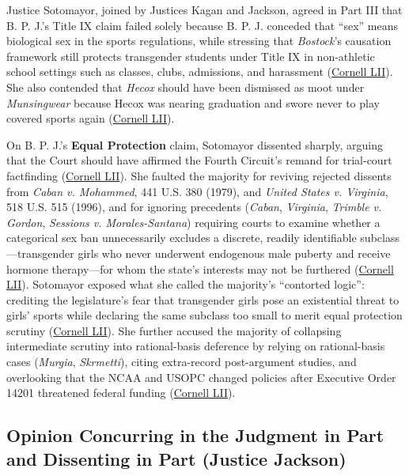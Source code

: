 \documentclass[12pt]{article}
\begin{document}
Justice Sotomayor, joined by Justices Kagan and Jackson, agreed in Part III that B. P. J.'s Title IX claim failed solely because B. P. J. conceded that ``sex'' means biological sex in the sports regulations, while stressing that \textit{Bostock}'s causation framework still protects transgender students under Title IX in non-athletic school settings such as classes, clubs, admissions, and harassment (\href{https://www.law.cornell.edu/supremecourt/text/24-43}{Cornell LII}). She also contended that \textit{Hecox} should have been dismissed as moot under \textit{Munsingwear} because Hecox was nearing graduation and swore never to play covered sports again (\href{https://www.law.cornell.edu/supremecourt/text/24-43}{Cornell LII}).

On B. P. J.'s \textbf{Equal Protection} claim, Sotomayor dissented sharply, arguing that the Court should have affirmed the Fourth Circuit's remand for trial-court factfinding (\href{https://www.law.cornell.edu/supremecourt/text/24-43}{Cornell LII}). She faulted the majority for reviving rejected dissents from \textit{Caban v. Mohammed}, 441 U.S. 380 (1979), and \textit{United States v. Virginia}, 518 U.S. 515 (1996), and for ignoring precedents (\textit{Caban}, \textit{Virginia}, \textit{Trimble v. Gordon}, \textit{Sessions v. Morales-Santana}) requiring courts to examine whether a categorical sex ban unnecessarily excludes a discrete, readily identifiable subclass---transgender girls who never underwent endogenous male puberty and receive hormone therapy---for whom the state's interests may not be furthered (\href{https://www.law.cornell.edu/supremecourt/text/24-43}{Cornell LII}). Sotomayor exposed what she called the majority's ``contorted logic'': crediting the legislature's fear that transgender girls pose an existential threat to girls' sports while declaring the same subclass too small to merit equal protection scrutiny (\href{https://www.law.cornell.edu/supremecourt/text/24-43}{Cornell LII}). She further accused the majority of collapsing intermediate scrutiny into rational-basis deference by relying on rational-basis cases (\textit{Murgia}, \textit{Skrmetti}), citing extra-record post-argument studies, and overlooking that the NCAA and USOPC changed policies after Executive Order 14201 threatened federal funding (\href{https://www.law.cornell.edu/supremecourt/text/24-43}{Cornell LII}).

\subsection{Opinion Concurring in the Judgment in Part and Dissenting in Part (Justice Jackson)}
\end{document}
